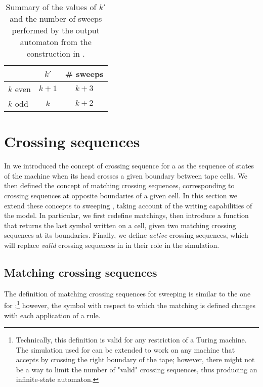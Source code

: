 \begin{table}
	\centering
	\begin{tabular}{lcc}
		\toprule
		~        & $k'$  & \# sweeps \\
		\midrule
		$k$ even & $k+1$ & $k+3$     \\
		$k$ odd  & $k$   & $k+2$     \\
		\bottomrule
	\end{tabular}
	\caption[The values of $k'$ and the number of sweeps performed by a sweeping \kDLA in normal form.]{Summary of the values of $k'$ and the number of sweeps performed by the output automaton from the construction in .}
	\label{tab:kprimesweep}
\end{table}



\section{Crossing sequences}\label{sec:crossseqswdla}
In  we introduced the concept of crossing sequence for a \TDFA as the sequence of states of the machine when its head crosses a given boundary between tape cells.
We then defined the concept of matching crossing sequences, corresponding to crossing sequences at opposite boundaries of a given cell.
In this section we extend these concepts to sweeping \kDLAs, taking account of the writing capabilities of the model.
In particular, we first redefine matchings, then introduce a function that returns the last symbol written on a cell, given two matching crossing sequences at its boundaries.
Finally, we define \emph{active} crossing sequences, which will replace \emph{valid} crossing sequences in \TDFAs in their role in the simulation.


\subsection{Matching crossing sequences}\label{sub:crossseqswdla-matching}
The definition of matching crossing sequences for sweeping \kDLAs is similar to the one for \TDFAs;\footnote{%
	Technically, this definition is valid for any restriction of a Turing machine. The simulation used for \TDFAs can be extended to work on any machine that accepts by crossing the right boundary of the tape; however, there might not be a way to limit the number of "valid" crossing sequences, thus producing an infinite-state automaton.}
however, the symbol with respect to which the matching is defined changes with each application of a rule.

